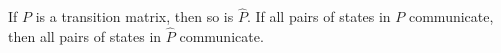 If $P$ is a transition matrix, then so is $\hat{P}$. If all pairs of states in $P$ communicate, then all pairs of states in $\hat{P}$ communicate.
